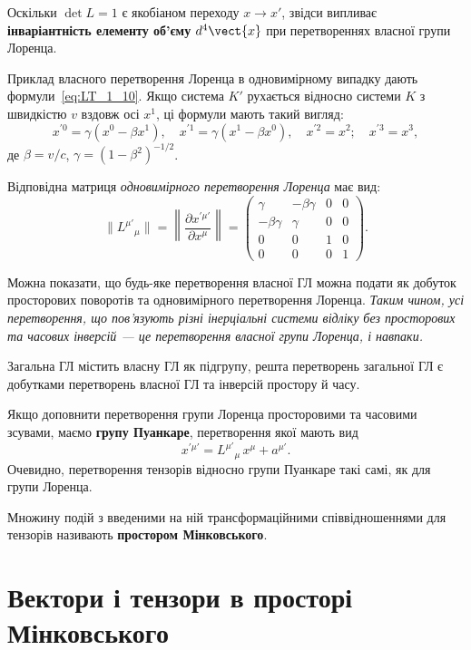 Оскільки $\det L = 1$ є якобіаном переходу $x \to x'$, звідси випливає
\textbf{інваріантність елементу об'єму} $d^4\vect{x}$ при перетвореннях власної
групи Лоренца.

Приклад власного перетворення Лоренца в одновимірному випадку дають
формули~\eqref{eq:LT_1_10}. Якщо система $K'$ рухається відносно системи $K$ з
швидкістю $v$ вздовж осі $x^1$, ці формули мають такий вигляд:
\[
  x^{\prime 0} = \gamma(x^0 - \beta x^1),\quad
  x^{\prime 1} = \gamma(x^1 - \beta x^0),\quad
  x^{\prime 2} = x^2;\quad
  x^{\prime 3} = x^3,
\]
де $\beta = v/c$, $\gamma = (1-\beta^2)^{-1/2}$.

Відповідна матриця \textit{одновимірного перетворення Лоренца} має вид:
\[
  \|L^{\mu'}{}_\mu\| = \left\|\frac{\partial x^{\prime\mu'}}{\partial x^\mu}\right\| =
  \begin{pmatrix}
    \gamma   & -\beta\gamma & 0 & 0\\
   -\beta\gamma & \gamma   & 0 & 0\\
    0        & 0          & 1 & 0\\
    0        & 0          & 0 & 1
  \end{pmatrix}.
\]

Можна показати, що будь-яке перетворення власної ГЛ можна подати як
добуток просторових поворотів та одновимірного перетворення Лоренца.
\textit{Таким чином, усі перетворення, що пов'язують різні інерціальні
системи відліку без просторових та часових інверсій --- це перетворення
власної групи Лоренца, і навпаки.}

Загальна ГЛ містить власну ГЛ як підгрупу, решта перетворень загальної
ГЛ є добутками перетворень власної ГЛ та інверсій простору й часу.

Якщо доповнити перетворення групи Лоренца просторовими та часовими
зсувами, маємо \textbf{групу Пуанкаре}, перетворення якої мають вид
\[
  x^{\prime\mu'} = L^{\mu'}{}_\mu\, x^\mu + a^{\mu'}.
\]
Очевидно, перетворення тензорів відносно групи Пуанкаре такі самі, як
для групи Лоренца.

Множину подій з введеними на ній трансформаційними співвідношеннями для
тензорів називають \textbf{простором Мінковського}.

\section{Вектори і тензори в просторі Мінковського}

